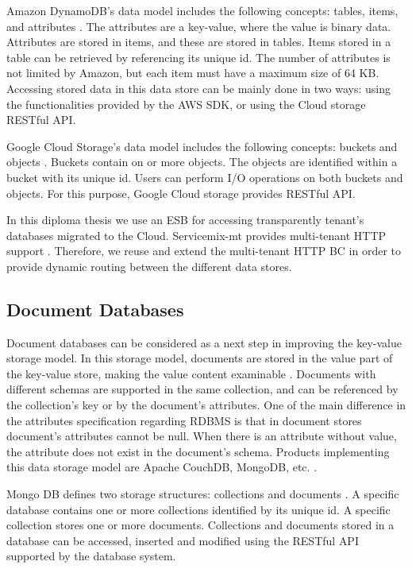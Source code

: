 Amazon DynamoDB's data model includes the following concepts: tables, items, and attributes \cite{amazondynamodb}. The attributes are a key-value, where the value is binary data. Attributes are stored in items, and these are stored in tables. Items stored in a table can be retrieved by referencing its unique id. The number of attributes is not limited by Amazon, but each item must have a maximum size of 64 KB. Accessing stored data in this data store can be mainly done in two ways: using the functionalities provided by the AWS SDK, or using the Cloud storage RESTful \ac{API}. 

Google Cloud Storage's data model includes the following concepts: buckets and objects \cite{googlecloudstorage}. Buckets contain on or more objects. The objects are identified within a bucket with its unique id. Users can perform I/O operations on both buckets and objects. For this purpose, Google Cloud storage provides RESTful \ac{API}.

In this diploma thesis we use an \ac{ESB} for accessing transparently tenant's databases migrated to the Cloud. Servicemix-mt provides multi-tenant \ac{HTTP} support \cite{gomez2012}. Therefore, we reuse and extend the multi-tenant \ac{HTTP} \ac{BC} in order to provide dynamic routing between the different data stores.

\subsection{Document Databases}

Document databases can be considered as a next step in improving the key-value storage model. In this storage model, documents are stored in the value part of the key-value store, making the value content examinable \cite{nosql2012}. Documents with different schemas are supported in the same collection, and can be referenced by the collection's key or by the document's attributes. One of the main difference in the attributes specification regarding \ac{RDBMS} is that in document stores document's attributes cannot be null. When there is an attribute without value, the attribute does not exist in the document's schema. Products implementing this data storage model are Apache CouchDB, MongoDB, etc. \cite{couchdb} \cite{mongodb}.

Mongo DB defines two storage structures: collections and documents \cite{mongodb}. A specific database contains one or more collections identified by its unique id. A specific collection stores one or more documents. Collections and documents stored in a database can be accessed, inserted and modified using the RESTful \ac{API} supported by the database system.

